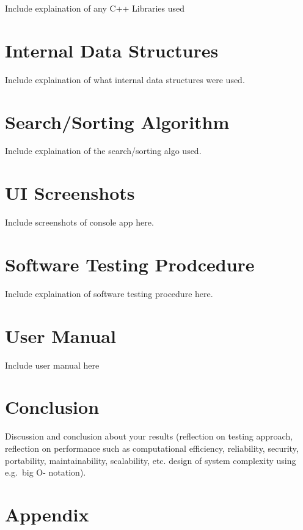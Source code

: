 \documentclass[
  english,
  a4paper,
,tablecaptionabove
]{scrartcl}
\begin{document}
Include explaination of any C++ Libraries used

\newpage

\hypertarget{internal-data-structures}{%
\section{Internal Data Structures}\label{internal-data-structures}}

Include explaination of what internal data structures were used.

\newpage

\hypertarget{searchsorting-algorithm}{%
\section{Search/Sorting Algorithm}\label{searchsorting-algorithm}}

Include explaination of the search/sorting algo used.

\newpage

\hypertarget{ui-screenshots}{%
\section{UI Screenshots}\label{ui-screenshots}}

Include screenshots of console app here.

\newpage

\hypertarget{software-testing-prodcedure}{%
\section{Software Testing
Prodcedure}\label{software-testing-prodcedure}}

Include explaination of software testing procedure here.

\newpage

\hypertarget{user-manual}{%
\section{User Manual}\label{user-manual}}

Include user manual here

\newpage

\hypertarget{conclusion}{%
\section{Conclusion}\label{conclusion}}

Discussion and conclusion about your results (reflection on testing
approach, reflection on performance such as computational efficiency,
reliability, security, portability, maintainability, scalability, etc.
design of system complexity using e.g.~big O- notation).

\newpage

\hypertarget{appendix}{%
\section{Appendix}\label{appendix}}

\newpage
\end{document}
